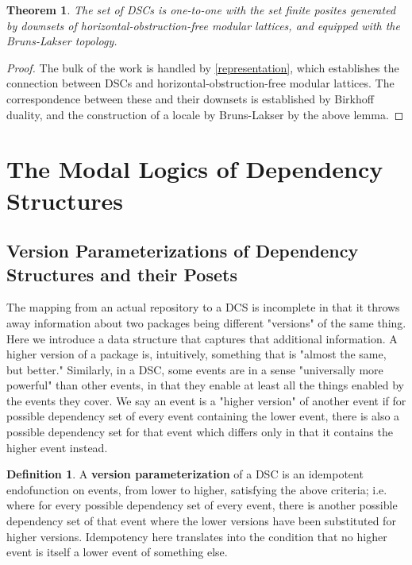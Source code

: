\documentclass[hoptionsi,review,format=acmsmall]{acmart}
\newtheorem{theorem}{Theorem}[section]
\theoremstyle{definition}
\newtheorem{definition}{Definition}[section]
\begin{document}
\begin{theorem}
The set of DSCs is one-to-one with the set finite posites generated by downsets of horizontal-obstruction-free modular lattices, and equipped with the Bruns-Lakser topology.
\end{theorem}
\begin{proof}
The bulk of the work is handled by \ref{representation}, which establishes the connection between DSCs and horizontal-obstruction-free modular lattices. The correspondence between these and their downsets is established by Birkhoff duality, and the construction of a locale by Bruns-Lakser by the above lemma.
\end{proof}

\section{The Modal Logics of Dependency Structures}
\subsection{Version Parameterizations of Dependency Structures and their Posets}

The mapping from an actual repository to a DCS is incomplete in that it throws away information about two packages being different "versions" of the same thing. Here we introduce a data structure that captures that additional information. A higher version of a package is, intuitively, something that is "almost the same, but better." Similarly, in a DSC, some events are in a sense "universally more powerful" than other events, in that they enable at least all the things enabled by the events they cover. We say an event is a "higher version" of another event if for possible dependency set of every event containing the lower event, there is also a possible dependency set for that event which differs only in that it contains the higher event instead.

\begin{definition}
A \textbf{version parameterization} of a DSC is an idempotent endofunction on events, from lower to higher, satisfying the above criteria; i.e. where for every possible dependency set of every event, there is another possible dependency set of that event where the lower versions have been substituted for higher versions. Idempotency here translates into the condition that no higher event is itself a lower event of something else.
\end{definition}
\end{document}
